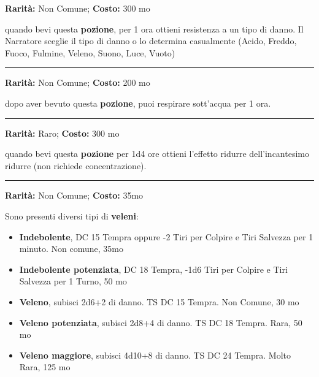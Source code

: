 \begin{multicols}{2}
\textbf{Rarità:} Non Comune; \textbf{Costo:} 300 mo

quando bevi questa \textbf{pozione}, per 1 ora ottieni resistenza a un tipo di danno. Il Narratore sceglie il tipo di danno o lo determina casualmente (Acido, Freddo, Fuoco, Fulmine, Veleno, Suono, Luce, Vuoto)

\smallskip\noindent\rule{\linewidth}{2pt}  \hypertarget{PozionediRespirareSott'Acqua}{}\medskip{}\noindent\label{PozionediRespirareSott'Acqua}

\textbf{Rarità:} Non Comune; \textbf{Costo:} 200 mo

dopo aver bevuto questa \textbf{pozione}, puoi respirare sott'acqua per 1 ora.

\smallskip\noindent\rule{\linewidth}{2pt}  \hypertarget{PozionediRimpicciolimento}{}\medskip{}\noindent\label{PozionediRimpicciolimento}

\textbf{Rarità:} Raro; \textbf{Costo:} 300 mo

quando bevi questa \textbf{pozione} per 1d4 ore ottieni l'effetto ridurre dell'incantesimo  ridurre (non richiede concentrazione).

\smallskip\noindent\rule{\linewidth}{2pt}  \hypertarget{PozionediVeleno}{}\medskip{}\noindent\label{PozionediVeleno}

\textbf{Rarità:} Non Comune; \textbf{Costo:} 35mo

Sono presenti diversi tipi di \textbf{veleni}:


\begin{itemize} \setlength\itemsep{0em}
\item \textbf{Indebolente}, DC 15 Tempra oppure -2 Tiri per Colpire e Tiri Salvezza per 1 minuto. Non comune, 35mo
\item \textbf{Indebolente potenziata}, DC 18 Tempra, -1d6 Tiri per Colpire e Tiri Salvezza per 1 Turno, 50 mo
\item \textbf{Veleno}, subisci 2d6+2 di danno. TS DC 15 Tempra. Non Comune, 30 mo
\item \textbf{Veleno potenziata}, subisci 2d8+4 di danno. TS DC 18 Tempra. Rara, 50 mo
\item \textbf{Veleno maggiore}, subisci 4d10+8 di danno. TS DC 24 Tempra. Molto Rara, 125 mo
\end{itemize}



\end{multicols}

